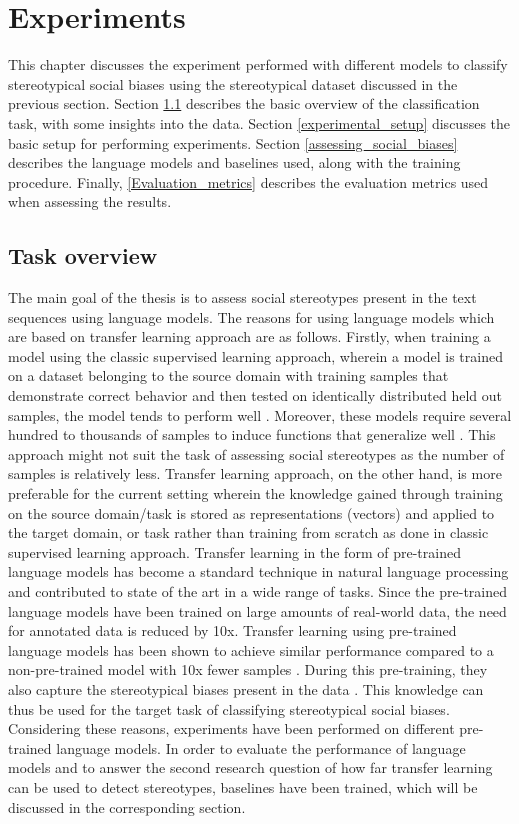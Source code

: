 \chapter{Experiments}

This chapter discusses the experiment performed with different models to classify stereotypical social biases using the stereotypical dataset discussed in the previous section. Section \ref{task_overview} describes the basic overview of the classification task, with some insights into the data. Section \ref{experimental_setup}  discusses the basic setup for performing experiments. Section \ref{assessing_social_biases} describes the language models and baselines used, along with the training procedure. Finally, \ref{Evaluation_metrics} describes the evaluation metrics used when assessing the results.

\section{Task overview}\label{task_overview}
The main goal of the thesis is to assess social stereotypes present in the text sequences using language models. The reasons for using language models which are based on transfer learning approach are as follows. Firstly, when training a model using the classic supervised learning approach, wherein a model is trained on a dataset belonging to the source domain with training samples that demonstrate correct behavior and then tested on identically distributed held out samples, the model tends to perform well \cite{ruder2019neural}. Moreover, these models require several hundred to thousands of samples to induce functions that generalize well \cite{radford2019language}. This approach might not suit the task of assessing social stereotypes as the number of samples is relatively less. Transfer learning approach, on the other hand, is more preferable for the current setting wherein the knowledge gained through training on the source domain/task is stored as representations (vectors) and applied to the target domain, or task \cite{ruder2019neural} rather than training from scratch as done in classic supervised learning approach. Transfer learning in the form of pre-trained language models has become a standard technique in natural language processing and contributed to state of the art in a wide range of tasks\cite{ruder2019transfer}. Since the pre-trained language models have been trained on large amounts of real-world data, the need for annotated data is reduced by 10x. Transfer learning using pre-trained language models has been shown to achieve similar performance compared to a non-pre-trained model with 10x fewer samples \cite{howard2018universal}. During this pre-training, they also capture the stereotypical biases present in the data \cite{nadeem2020stereoset}. This knowledge can thus be used for the target task of classifying stereotypical social biases. Considering these reasons, experiments have been performed on different pre-trained language models. In order to evaluate the performance of language models and to answer the second research question of how far transfer learning can be used to detect stereotypes, baselines have been trained, which will be discussed in the corresponding section.

